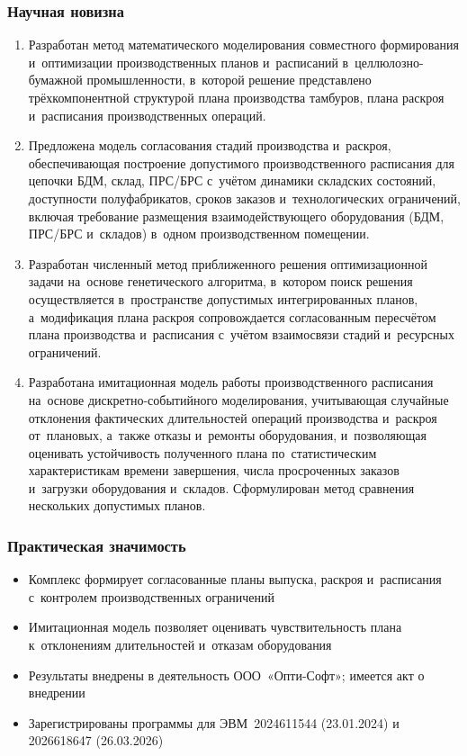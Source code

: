 \begin{frame}[t,allowframebreaks]
    \frametitle{Научная новизна}
    
    \begin{enumerate}
        \item Разработан метод математического моделирования совместного формирования и~оптимизации производственных планов и~расписаний в~целлюлозно-бумажной промышленности, в~которой решение представлено трёхкомпонентной структурой плана производства тамбуров, плана раскроя и~расписания производственных операций.
        \item Предложена модель согласования стадий производства и~раскроя, обеспечивающая построение допустимого производственного расписания для цепочки БДМ, склад, ПРС/БРС с~учётом динамики складских состояний, доступности полуфабрикатов, сроков заказов и~технологических ограничений, включая требование размещения взаимодействующего оборудования (БДМ, ПРС/БРС и~складов) в~одном производственном помещении.
        \item Разработан численный метод приближенного решения оптимизационной задачи на~основе генетического алгоритма, в~котором поиск решения осуществляется в~пространстве допустимых интегрированных планов, а~модификация плана раскроя сопровождается согласованным пересчётом плана производства и~расписания с~учётом взаимосвязи стадий и~ресурсных ограничений.
        \item Разработана имитационная модель работы производственного расписания на~основе дискретно-событийного моделирования, учитывающая случайные отклонения фактических длительностей операций производства и~раскроя от~плановых, а~также отказы и~ремонты оборудования, и~позволяющая оценивать устойчивость полученного плана по~статистическим характеристикам времени завершения, числа просроченных заказов и~загрузки оборудования и~складов. Сформулирован метод сравнения нескольких допустимых планов.
    \end{enumerate}
\end{frame}


\begin{frame}
    \frametitle{Практическая значимость}
    \begin{itemize}
        \item Комплекс формирует согласованные планы выпуска, раскроя и~расписания с~контролем производственных ограничений
        \item Имитационная модель позволяет оценивать чувствительность плана к~отклонениям длительностей и~отказам оборудования
        \item Результаты внедрены в деятельность ООО~«Опти-Софт»; имеется акт о внедрении
        \item Зарегистрированы программы для ЭВМ \textnumero\,2024611544 (23.01.2024) и~\textnumero\,2026618647 (26.03.2026)
    \end{itemize}
\end{frame}

